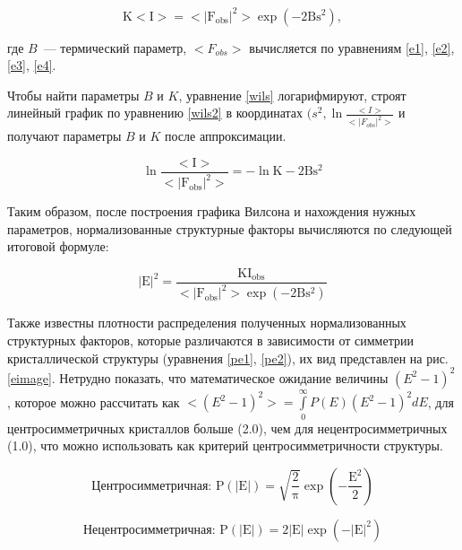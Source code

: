 \begin{equation}\label{wils}
	\mathrm{K<I> = <|F_{obs}|^2>\exp(-2Bs^2)},
\end{equation}

где $B$~--- термический параметр, $<F_{obs}>$ вычисляется по уравнениям \ref{e1}, \ref{e2}, \ref{e3}, \ref{e4}.

Чтобы найти параметры $B$ и $K$, уравнение \ref{wils} логарифмируют, строят линейный график по уравнению \ref{wils2} в координатах $(s^2,\ln\frac{<I>}{<|F_{obs}|^2>}$ и получают параметры $B$ и $K$ после аппроксимации.

\begin{equation}\label{wils2}
	\mathrm{\ln\frac{<I>}{<|F_{obs}|^2>} = -\ln K-2Bs^2}
\end{equation}

Таким образом, после построения графика Вилсона и нахождения нужных параметров, нормализованные структурные факторы вычисляются по следующей итоговой формуле:

\begin{equation}
	\mathrm{|E|^2 = \frac{KI_{obs}}{<|F_{obs}|^2>\exp(-2Bs^2)}}
\end{equation}

Также известны \cite{giacovazzo_international_2010} плотности распределения полученных нормализованных структурных факторов, которые различаются в зависимости от симметрии кристаллической структуры (уравнения \ref{pe1}, \ref{pe2}), их вид представлен на рис. \ref{eimage}. Нетрудно показать, что математическое ожидание величины $(E^2-1)^2$, которое можно рассчитать как $<(E^2-1)^2> = \int\limits_0^\infty P(E)(E^2-1)^2dE$, для центросимметричных кристаллов больше (2.0), чем для нецентросимметричных (1.0), что можно использовать как критерий центросимметричности структуры.

\begin{equation}\label{pe1}
	\mathrm{\text{Центросимметричная: }P(|E|)=\sqrt{\frac{2}{\pi}}\exp(-\frac{E^2}{2})}
\end{equation}

\begin{equation}\label{pe2}
	\mathrm{\text{Нецентросимметричная: }P(|E|) = 2|E|\exp(-|E|^2)}
\end{equation}

